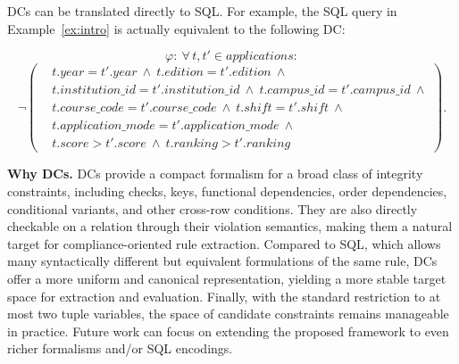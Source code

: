DCs can be translated directly to SQL.
For example,  the SQL query in Example~\ref{ex:intro} is actually equivalent to the following DC:

\begingroup\small
\[
\varphi:\ \forall\, t, t' \in \mathit{applications}:
\]
\[ 
\neg\!\left(
\begin{aligned}
& t.\mathit{year}=t'.\mathit{year}\ \land\ t.\mathit{edition}=t'.\mathit{edition}\ \land \\
& t.\mathit{institution\_id}=t'.\mathit{institution\_id}\ \land\ t.\mathit{campus\_id}=t'.\mathit{campus\_id}\ \land \\
& t.\mathit{course\_code}=t'.\mathit{course\_code}\ \land\ t.\mathit{shift}=t'.\mathit{shift}\ \land \\
& t.\mathit{application\_mode}=t'.\mathit{application\_mode}\ \land \\
& t.\mathit{score}>t'.\mathit{score}\ \land\ t.\mathit{ranking}>t'.\mathit{ranking}
\end{aligned}
\right).
\]
\endgroup

\smallskip\noindent\textbf{Why DCs.}
DCs provide a compact formalism for a broad class of integrity constraints, including checks, keys, functional dependencies, order dependencies, conditional variants, and other cross-row conditions. They are also directly checkable on a relation through their violation semantics, making them a natural target for compliance-oriented rule extraction. Compared to SQL, which allows many syntactically different but equivalent formulations of the same rule, DCs offer a more uniform and canonical representation, yielding a more stable target space for extraction and evaluation. Finally, with the standard restriction to at most two tuple variables, the space of candidate constraints remains manageable in practice. Future work can focus on extending the proposed framework to even richer formalisms and/or SQL encodings.







